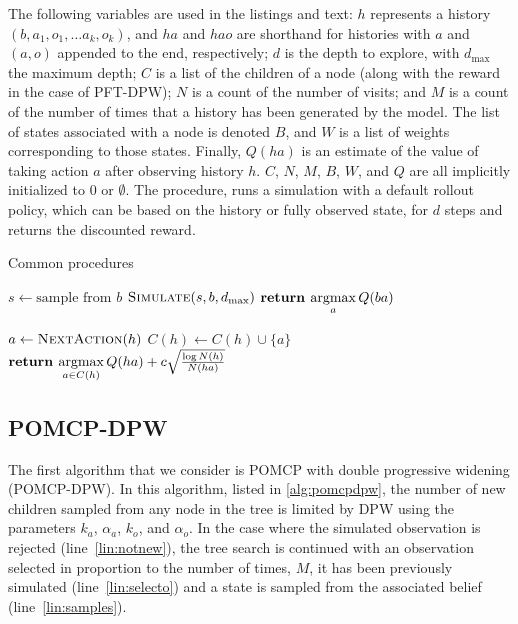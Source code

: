 The following variables are used in the listings and text:
$h$ represents a history $(b, a_1, o_1, \dots a_k, o_k)$, and $ha$ and $hao$ are shorthand for histories with $a$ and $(a,o)$ appended to the end, respectively;
$d$ is the depth to explore, with $d_\text{max}$ the maximum depth;
$C$ is a list of the children of a node (along with the reward in the case of PFT-DPW);
$N$ is a count of the number of visits; and $M$ is a count of the number of times that a history has been generated by the model.
The list of states associated with a node is denoted $B$, and $W$ is a list of weights corresponding to those states.
Finally, $Q(ha)$ is an estimate of the value of taking action $a$ after observing history $h$.
$C$, $N$, $M$, $B$, $W$, and $Q$ are all implicitly initialized to \num{0} or $\emptyset$.
The  procedure, runs a simulation with a default rollout policy, which can be based on the history or fully observed state, for $d$ steps and returns the discounted reward.

\begin{algorithm}[htbp]
    \caption{Common procedures} \label{alg:common}
    \begin{algorithmic}[1]
                \State $s \gets \text{sample from }b$
                \State $\Call{Simulate}{s, b, d_\text{max}}$
            \EndFor
            \State $\textbf{return } \underset{a}{\argmax}\, Q(ba)$
        \EndProcedure

                \State $a \gets \Call{NextAction}{h}$
                \State $C(h) \gets C(h) \cup \{a\}$
            \EndIf
            \State $\textbf{return } \underset{a \in C(h)}{\argmax}\, Q(ha) + c \sqrt{\frac{\log N(h)}{N(ha)}}$
        \EndProcedure

    \end{algorithmic}
\end{algorithm}


\subsection{POMCP-DPW}

The first algorithm that we consider is POMCP with double progressive widening (POMCP-DPW).
In this algorithm, listed in \cref{alg:pomcpdpw}, the number of new children sampled from any node in the tree is limited by DPW using the parameters $k_a$, $\alpha_a$, $k_o$, and $\alpha_o$.
In the case where the simulated observation is rejected (line~\ref{lin:notnew}), the tree search is continued with an observation selected in proportion to the number of times, $M$, it has been previously simulated (line~\ref{lin:selecto}) and a state is sampled from the associated belief (line~\ref{lin:samples}).

